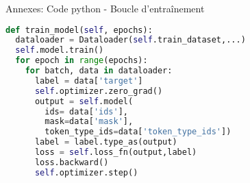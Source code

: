 \documentclass[12pt]{beamer}
\begin{document}
\begin{frame}[fragile]{Annexes: Code python - Boucle d'entraînement}
\vspace{-7px}

\footnotesize
\begin{tcolorbox}[colback=white,boxsep=2mm,arc=1pt,
    auto outer arc,left=1mm,right=1mm,top=1mm,bottom=1mm,boxrule=0.5pt,width=\textwidth]

\begin{minipage}{\textwidth * 1 / 11}
\begin{lstlisting}[language=python]
def train_model(self, epochs):
  dataloader = Dataloader(self.train_dataset,...)
  self.model.train()
  for epoch in range(epochs):
    for batch, data in dataloader:
      label = data['target']
      self.optimizer.zero_grad()
      output = self.model(
        ids= data['ids'],
        mask=data['mask'],
        token_type_ids=data['token_type_ids'])
      label = label.type_as(output)
      loss = self.loss_fn(output,label)
      loss.backward()
      self.optimizer.step()
\end{lstlisting}

\end{minipage}
\end{tcolorbox}
\normalsize
\end{frame}
\end{document}
